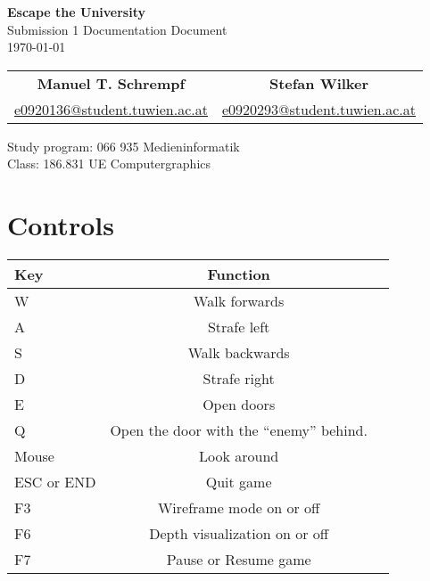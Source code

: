 \documentclass[12pt]{article}
\begin{document}
\begin{titlepage}
 \vspace*{8cm}
\begin{center}
 \textbf{\Huge Escape the University} \\
  \vspace{3mm}
 {\Large Submission 1 Documentation Document\\
  \vspace{3mm}
  \today}
 \vspace{5mm}
\begin{table}[h!]
  \centering
  \begin{tabular}{c c}
	\textbf{Manuel T. Schrempf}  &   \textbf{Stefan Wilker}\\
	\href{mailto:e0920136@student.tuwien.ac.at}{e0920136@student.tuwien.ac.at}&
	\href{mailto:e0920293@student.tuwien.ac.at}{e0920293@student.tuwien.ac.at}\\
  \end{tabular}
\end{table}

 \vspace{3mm}
{\large Study program: 066 935 Medieninformatik\\
 \vspace{2mm}
Class: 186.831 UE Computergraphics}
\end{center}
\end{titlepage}
\tableofcontents %
\newpage
\pagestyle{plain}
\setcounter{page}{1}

\section{Controls \label{Controls}}

\begin{table}[h!]
  \centering
  \label{table1}
  \begin{tabular}{p{3cm} c c}
Key & Function\\
    \hline
W & Walk forwards	\\
A & Strafe left \\
S & Walk backwards \\
D & Strafe right \\
E & Open doors\\
Q & Open the door with the ``enemy'' behind.\\

Mouse & Look around\\

 ESC or END & Quit game \\
 F3 & Wireframe mode on or off \\
 F6 & Depth visualization on or off\\ %
 F7 & Pause or Resume game \\
  \end{tabular}
\end{table}
\end{document}
